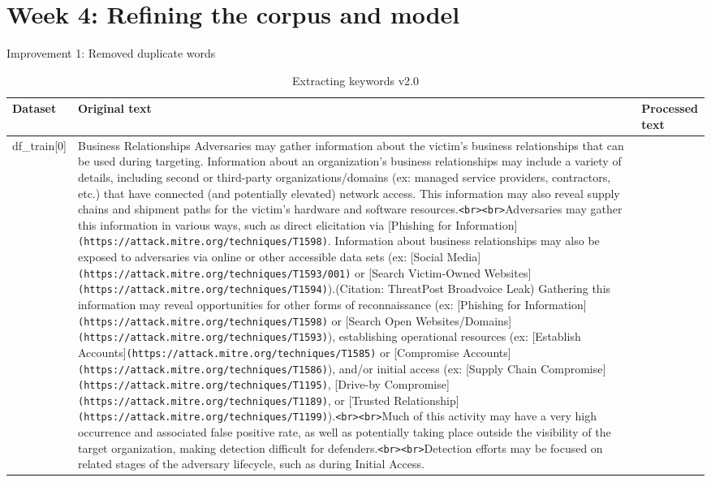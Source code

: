 \section*{Week 4: Refining the corpus and model}

Improvement 1: Removed duplicate words\\
\begin{table}[h]
    \caption{Extracting keywords v2.0}
    \label{crouch}
    \begin{tabularx}{\textwidth}{p{}XX}
        \toprule
        \textbf{Dataset} & \textbf{Original text} & \textbf{Processed text} \\
        \midrule
        df\_train[0] &
        Business Relationships Adversaries may gather information about the victim's business relationships that can be used during targeting. Information about an organization's business relationships may include a variety of details, including second or third-party organizations/domains (ex: managed service providers, contractors, etc.) that have connected (and potentially elevated) network access. This information may also reveal supply chains and shipment paths for the victim's hardware and software resources.\verb|<br><br>|Adversaries may gather this information in various ways, such as direct elicitation via [Phishing for Information]\nolinkurl{(https://attack.mitre.org/techniques/T1598)}. Information about business relationships may also be exposed to adversaries via online or other accessible data sets (ex: [Social Media]\nolinkurl{(https://attack.mitre.org/techniques/T1593/001)} or [Search Victim-Owned Websites]\nolinkurl{(https://attack.mitre.org/techniques/T1594)}).(Citation: ThreatPost Broadvoice Leak) Gathering this information may reveal opportunities for other forms of reconnaissance (ex: [Phishing for Information]\nolinkurl{(https://attack.mitre.org/techniques/T1598)} or [Search Open Websites/Domains]\nolinkurl{(https://attack.mitre.org/techniques/T1593)}), establishing operational resources (ex: [Establish Accounts]\nolinkurl{(https://attack.mitre.org/techniques/T1585)} or [Compromise Accounts]\nolinkurl{(https://attack.mitre.org/techniques/T1586)}), and/or initial access (ex: [Supply Chain Compromise]\nolinkurl{(https://attack.mitre.org/techniques/T1195)}, [Drive-by Compromise]\nolinkurl{(https://attack.mitre.org/techniques/T1189)}, or [Trusted Relationship]\nolinkurl{(https://attack.mitre.org/techniques/T1199)}).\verb|<br><br>|Much of this activity may have a very high occurrence and associated false positive rate, as well as potentially taking place outside the visibility of the target organization, making detection difficult for defenders.\verb|<br><br>|Detection efforts may be focused on related stages of the adversary lifecycle, such as during Initial Access.

\end{tabularx}
\end{table}
